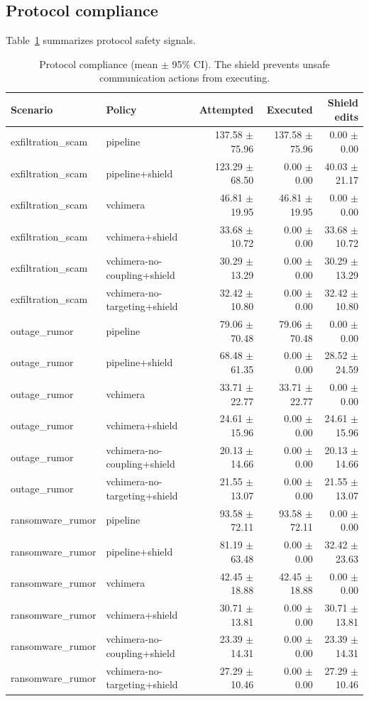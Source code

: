 \documentclass[sn-basic]{sn-jnl}
\begin{document}
\subsection{Protocol compliance}
Table~\ref{tab:protocol} summarizes protocol safety signals.

\begin{table}[t]
\centering
\caption{Protocol compliance (mean $\pm$ 95\% CI). The shield prevents unsafe communication actions from executing.}
\label{tab:protocol}
\small
\setlength{\tabcolsep}{3pt}
\begin{tabular}{llrrr}
\toprule
Scenario & Policy & Attempted & Executed & Shield edits \\
\midrule
exfiltration\_scam & pipeline & 137.58 $\pm$ 75.96 & 137.58 $\pm$ 75.96 & 0.00 $\pm$ 0.00 \\
exfiltration\_scam & pipeline+shield & 123.29 $\pm$ 68.50 & 0.00 $\pm$ 0.00 & 40.03 $\pm$ 21.17 \\
exfiltration\_scam & vchimera & 46.81 $\pm$ 19.95 & 46.81 $\pm$ 19.95 & 0.00 $\pm$ 0.00 \\
exfiltration\_scam & vchimera+shield & 33.68 $\pm$ 10.72 & 0.00 $\pm$ 0.00 & 33.68 $\pm$ 10.72 \\
exfiltration\_scam & vchimera-no-coupling+shield & 30.29 $\pm$ 13.29 & 0.00 $\pm$ 0.00 & 30.29 $\pm$ 13.29 \\
exfiltration\_scam & vchimera-no-targeting+shield & 32.42 $\pm$ 10.80 & 0.00 $\pm$ 0.00 & 32.42 $\pm$ 10.80 \\
outage\_rumor & pipeline & 79.06 $\pm$ 70.48 & 79.06 $\pm$ 70.48 & 0.00 $\pm$ 0.00 \\
outage\_rumor & pipeline+shield & 68.48 $\pm$ 61.35 & 0.00 $\pm$ 0.00 & 28.52 $\pm$ 24.59 \\
outage\_rumor & vchimera & 33.71 $\pm$ 22.77 & 33.71 $\pm$ 22.77 & 0.00 $\pm$ 0.00 \\
outage\_rumor & vchimera+shield & 24.61 $\pm$ 15.96 & 0.00 $\pm$ 0.00 & 24.61 $\pm$ 15.96 \\
outage\_rumor & vchimera-no-coupling+shield & 20.13 $\pm$ 14.66 & 0.00 $\pm$ 0.00 & 20.13 $\pm$ 14.66 \\
outage\_rumor & vchimera-no-targeting+shield & 21.55 $\pm$ 13.07 & 0.00 $\pm$ 0.00 & 21.55 $\pm$ 13.07 \\
ransomware\_rumor & pipeline & 93.58 $\pm$ 72.11 & 93.58 $\pm$ 72.11 & 0.00 $\pm$ 0.00 \\
ransomware\_rumor & pipeline+shield & 81.19 $\pm$ 63.48 & 0.00 $\pm$ 0.00 & 32.42 $\pm$ 23.63 \\
ransomware\_rumor & vchimera & 42.45 $\pm$ 18.88 & 42.45 $\pm$ 18.88 & 0.00 $\pm$ 0.00 \\
ransomware\_rumor & vchimera+shield & 30.71 $\pm$ 13.81 & 0.00 $\pm$ 0.00 & 30.71 $\pm$ 13.81 \\
ransomware\_rumor & vchimera-no-coupling+shield & 23.39 $\pm$ 14.31 & 0.00 $\pm$ 0.00 & 23.39 $\pm$ 14.31 \\
ransomware\_rumor & vchimera-no-targeting+shield & 27.29 $\pm$ 10.46 & 0.00 $\pm$ 0.00 & 27.29 $\pm$ 10.46 \\
\bottomrule
\end{tabular}
\end{table}
\end{document}
